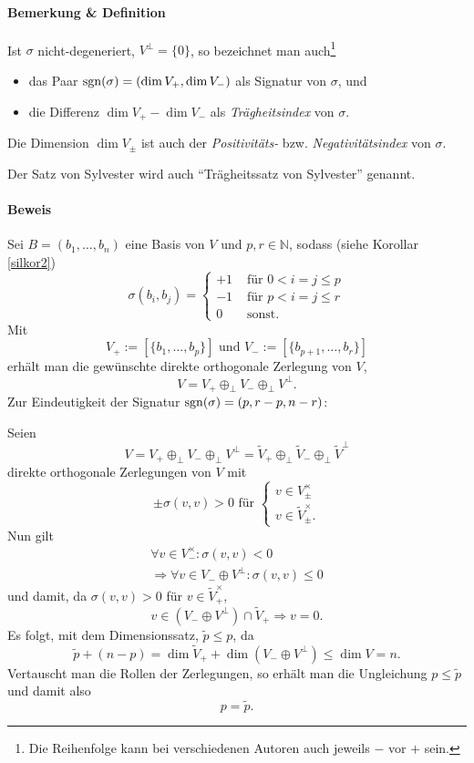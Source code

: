 \paragraph{Bemerkung \& Definition}
\begin{Definition}
	Ist $ \sigma $ nicht-degeneriert, $ V^\perp = \{0\} $, so bezeichnet man auch\footnote{Die Reihenfolge kann bei verschiedenen Autoren auch jeweils $ - $ vor $ + $ sein.}
		\begin{itemize}
			\item das Paar $ \operatorname{sgn} (\sigma) =(\dim V_+,\dim V_-)$ als Signatur von $ \sigma $, und
			\item die Differenz $ \dim V_+ - \dim V_- $ als \emph{Trägheitsindex} von $ \sigma $.
		\end{itemize}
	Die Dimension $ \dim V_\pm $ ist auch der \emph{Positivitäts-} bzw. \emph{Negativitätsindex} von $ \sigma $.
\end{Definition}	
	Der Satz von Sylvester wird auch "`Trägheitssatz von Sylvester"' genannt.
\paragraph{Beweis}
	Sei $ B=(b_1,\dots,b_n) $ eine Basis von $ V $ und $ p,r\in \mathbb{N} $, sodass (siehe Korollar \ref{silkor2})
		\[ \sigma(b_i,b_j) =
		\begin{cases}
			+1 & \text{ für } 0 < i=j\leq p\\
			-1 & \text{ für } p < i=j\leq r\\
			0 & \text{ sonst. }
		\end{cases} \]
	Mit
		\[ V_+ := [\{b_1,\dots,b_p \}] \text{ und } V_- := [\{b_{p+1},\dots,b_r\}] \]
	erhält man die gewünschte direkte orthogonale Zerlegung von $ V $,
		\[ V = V_+ \oplus_\perp V_- \oplus_\perp V^\perp. \]
	Zur Eindeutigkeit der Signatur $ \operatorname{sgn}(\sigma) = (p,r-p,n-r) $:
	
	Seien
	\[ V=V_+ \oplus_\perp V_- \oplus_\perp V^\perp
	= \tilde{V}_+\oplus_\perp\tilde{V}_-\oplus_\perp\tilde{V}^\perp \]
	direkte orthogonale Zerlegungen von $ V $ mit
		\[ \pm \sigma(v,v)>0 \text{ für }
			\begin{cases}
				v\in V_\pm^\times\\
				v\in \tilde{V}_\pm^\times.
			\end{cases} \]
	Nun gilt
	\begin{gather*}
		\forall v\in V_-^\times: \sigma(v,v)< 0 \\
		\Rightarrow \forall v\in V_- \oplus V^\perp: \sigma(v,v) \leq 0
	\end{gather*}
	und damit, da $ \sigma(v,v)>0 $ für $ v\in \tilde{V}_+^\times $,
		\[ v\in (V_-\oplus V^\perp)\cap \tilde{V}_+ \Rightarrow v= 0. \]
	Es folgt, mit dem Dimensionssatz, $ \tilde{p}\leq p $, da
		\[ \tilde{p}+(n-p) = \dim \tilde{V}_+ + \dim(V_-\oplus V^\perp) \leq \dim V = n. \]
	Vertauscht man die Rollen der Zerlegungen, so erhält man die Ungleichung $ p\leq \tilde{p} $ und damit also
		\[ p = \tilde{p}. \]
